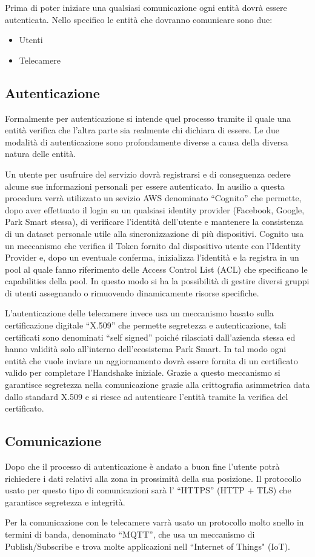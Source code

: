Prima di poter iniziare una qualsiasi comunicazione ogni entità dovrà essere autenticata. Nello specifico le entità che dovranno comunicare sono due:

\begin{itemize}
	\item Utenti
	\item Telecamere
\end{itemize}

\subsection*{Autenticazione} 
Formalmente per autenticazione si intende quel processo tramite il quale una entità verifica che l'altra parte sia realmente chi dichiara di essere.
Le due modalità di autenticazione sono profondamente diverse a causa della diversa natura delle entità. 

Un utente per usufruire del servizio dovrà registrarsi e di conseguenza cedere alcune sue informazioni personali per essere autenticato. 
In ausilio a questa procedura verrà utilizzato un sevizio AWS denominato ``Cognito'' che permette, dopo aver effettuato il login su un qualsiasi identity provider (Facebook, Google, Park Smart stessa), di verificare l'identità dell'utente e mantenere la consistenza di un dataset personale utile alla sincronizzazione di più dispositivi. 
Cognito usa un meccanismo che verifica il Token fornito dal dispositivo utente con l'Identity Provider e, dopo un eventuale conferma, inizializza l'identità e la registra in un pool al quale fanno riferimento delle Access Control List (ACL) che specificano le capabilities della pool. In questo modo si ha la possibilità di gestire diversi gruppi di utenti assegnando o rimuovendo dinamicamente risorse specifiche.

L'autenticazione delle telecamere invece usa un meccanismo basato sulla certificazione digitale ``X.509'' che permette segretezza e autenticazione, tali certificati sono denominati ``self signed'' poiché rilasciati dall'azienda stessa ed hanno validità solo all'interno dell'ecosistema Park Smart. 
In tal modo ogni entità che vuole inviare un aggiornamento dovrà essere fornita di un certificato valido per completare l'Handshake iniziale. 
Grazie a questo meccanismo si garantisce segretezza nella comunicazione grazie alla crittografia asimmetrica data dallo standard X.509 e si riesce ad autenticare l'entità tramite la verifica del certificato.

\subsection*{Comunicazione}
Dopo che il processo di autenticazione è andato a buon fine l'utente potrà richiedere i dati relativi alla zona in prossimità della sua posizione. Il protocollo usato per questo tipo di comunicazioni sarà l' ``HTTPS'' (HTTP + TLS) che garantisce segretezza e integrità.

Per la comunicazione con le telecamere varrà usato un protocollo molto snello in termini di banda, denominato ``MQTT'', che usa un meccanismo di Publish/Subscribe e trova molte applicazioni nell ``Internet of Things" (IoT).
